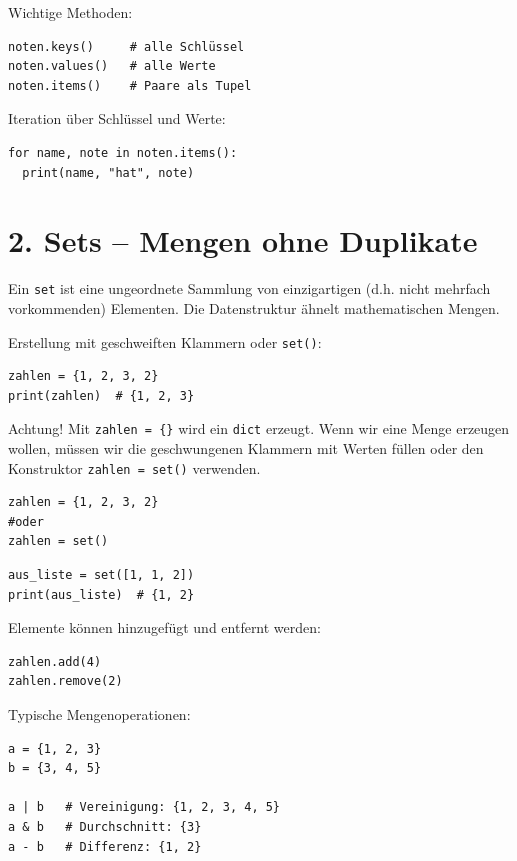 \documentclass[12pt]{article}
\begin{document}
	Wichtige Methoden:
	
\begin{verbatim}
noten.keys()     # alle Schlüssel
noten.values()   # alle Werte
noten.items()    # Paare als Tupel
\end{verbatim}
	
	Iteration über Schlüssel und Werte:
	
\begin{verbatim}
for name, note in noten.items():
  print(name, "hat", note)
\end{verbatim}

	
	\section*{2. Sets – Mengen ohne Duplikate}
	
	Ein \texttt{set} ist eine ungeordnete Sammlung von einzigartigen (d.h. nicht mehrfach vorkommenden) Elementen. Die Datenstruktur ähnelt mathematischen Mengen.
	
	Erstellung mit geschweiften Klammern oder \texttt{set()}:
	
\begin{verbatim}
zahlen = {1, 2, 3, 2}
print(zahlen)  # {1, 2, 3}
\end{verbatim}

	Achtung! Mit \verb|zahlen = {}| wird ein \verb|dict| erzeugt. Wenn wir eine Menge erzeugen wollen, müssen wir die geschwungenen Klammern mit Werten füllen oder den Konstruktor \verb|zahlen = set()| verwenden.

\begin{verbatim}
zahlen = {1, 2, 3, 2}
#oder
zahlen = set()
\end{verbatim}
	
\begin{verbatim}
aus_liste = set([1, 1, 2])
print(aus_liste)  # {1, 2}
\end{verbatim}
	
	Elemente können hinzugefügt und entfernt werden:
	
\begin{verbatim}
zahlen.add(4)
zahlen.remove(2)
\end{verbatim}
	
	Typische Mengenoperationen:
	
\begin{verbatim}
a = {1, 2, 3}
b = {3, 4, 5}

a | b   # Vereinigung: {1, 2, 3, 4, 5}
a & b   # Durchschnitt: {3}
a - b   # Differenz: {1, 2}
\end{verbatim}
	
\end{document}
